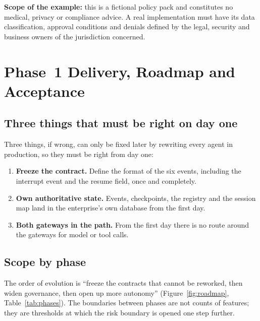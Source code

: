 \begin{notebox}
  \textbf{Scope of the example:} this is a fictional policy pack and constitutes no medical, privacy or compliance advice. A real implementation must have its data classification, approval conditions and denials defined by the legal, security and business owners of the jurisdiction concerned.
\end{notebox}

\section{Phase~1 Delivery, Roadmap and Acceptance}
\label{sec:mvp}

\subsection{Three things that must be right on day one}

Three things, if wrong, can only be fixed later by rewriting every agent in production, so they must be right from day one:

\begin{enumerate}
  \item \textbf{Freeze the contract.} Define the format of the six events, including the interrupt event and the resume field, once and completely.
  \item \textbf{Own authoritative state.} Events, checkpoints, the registry and the session map land in the enterprise's own database from the first day.
  \item \textbf{Both gateways in the path.} From the first day there is no route around the gateways for model or tool calls.
\end{enumerate}

\subsection{Scope by phase}

The order of evolution is ``freeze the contracts that cannot be reworked, then widen governance, then open up more autonomy'' (Figure~\ref{fig:roadmap}, Table~\ref{tab:phases}). The boundaries between phases are not counts of features; they are thresholds at which the risk boundary is opened one step further.

